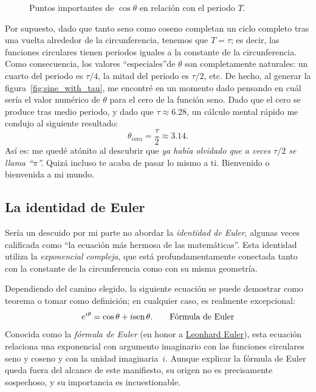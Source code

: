 \begin{figure}
\begin{center}
\end{center}
\caption{Puntos importantes de $\cos\theta$ en relación con el periodo $T$.\label{fig:cosine_with_tau}}
\end{figure}


Por supuesto, dado que tanto seno como coseno completan un ciclo completo tras una vuelta alrededor de la circunferencia, tenemos que $T = \tau$; es decir, las funciones circulares tienen periodos iguales a la constante de la circunferencia. Como consecuencia, los valores ``especiales''de $\theta$ son completamente naturales: un cuarto del periodo es $\tau/4$, la mitad del periodo es $\tau/2$, etc. De hecho, al generar la figura~\ref{fig:sine_with_tau}, me encontré en un momento dado pensando en cuál sería el valor numérico de $\theta$ para el cero de la función seno. Dado que el cero se produce tras medio periodo, y dado que $\tau \approx 6.28$, un cálculo mental rápido me condujo al siguiente resultado:
\[
  \theta_\mathrm{cero} = \frac{\tau}{2} \approx 3.14.
\]
Así es: me quedé atónito al descubrir que \emph{ya había olvidado que a veces $\tau/2$ se llama ``$\pi$''.} Quizá incluso te acaba de pasar lo mismo a ti. Bienvenido o bienvenida a mi mundo.



   \subsection{La identidad de Euler} %
   \label{sec:euler_s_identity}

Sería un descuido por mi parte no abordar la \emph{identidad de Euler}, algunas veces calificada como ``la ecuación más hermosa de las matemáticas''. Esta identidad utiliza la \emph{exponencial compleja}, que está profundamentamente conectada tanto con la constante de la circunferencia como con su misma geometría.

Dependiendo del camino elegido, la siguiente ecuación se puede demostrar como teorema o tomar como definición; en cualquier caso, es realmente excepcional:
\begin{equation}
\label{eq:eulers_formula}
e^{i\theta} = \cos\theta + i\mbox{sen}\,\theta. \qquad\mbox{Fórmula de Euler}
\end{equation}
Conocida como la \emph{fórmula de Euler} (en honor a \href{https://es.wikipedia.org/wiki/Leonhard_Euler}{Leonhard Euler}), esta ecuación relaciona una exponencial con argumento imaginario con las funciones circulares seno y coseno y con la unidad imaginaria~$i$. Aunque explicar la fórmula de Euler queda fuera del alcance de este manifiesto, su origen no es precisamente sospechoso, y su importancia es incuestionable.

